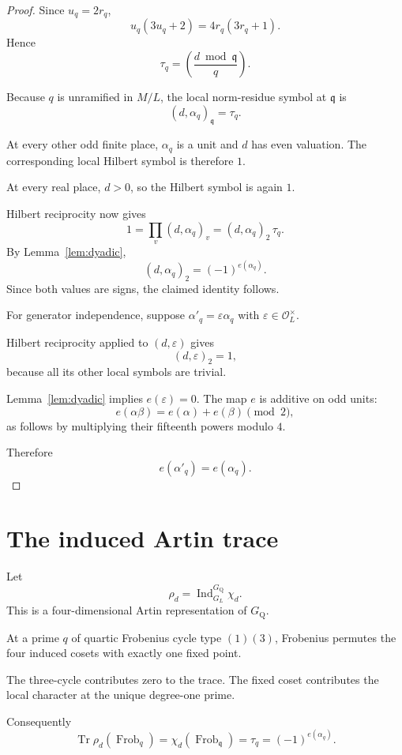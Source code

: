 \documentclass[11pt]{article}
\newcommand{\Q}{\mathrm Q}
\newcommand{\Ocal}{\mathcal O}
\newcommand{\Frob}{\operatorname{Frob}}
\begin{document}
\begin{proof}
Since $u_q=2r_q$,
\[
u_q(3u_q+2)
=4r_q(3r_q+1).
\]
Hence
\[
\tau_q=
\left(\frac{d\bmod\mathfrak q}{q}\right).
\]

Because $q$ is unramified in $M/L$,
the local norm-residue symbol at
$\mathfrak q$ is
\[
(d,\alpha_q)_{\mathfrak q}=\tau_q.
\]

At every other odd finite place,
$\alpha_q$ is a unit and $d$ has even
valuation. The corresponding local
Hilbert symbol is therefore $1$.

At every real place, $d>0$, so the
Hilbert symbol is again $1$.

Hilbert reciprocity now gives
\[
1=\prod_v(d,\alpha_q)_v
=(d,\alpha_q)_2\,\tau_q.
\]
By Lemma~\ref{lem:dyadic},
\[
(d,\alpha_q)_2=(-1)^{e(\alpha_q)}.
\]
Since both values are signs, the
claimed identity follows.

For generator independence, suppose
$\alpha'_q=\varepsilon\alpha_q$
with $\varepsilon\in\Ocal_L^\times$.

Hilbert reciprocity applied to
$(d,\varepsilon)$ gives
\[
(d,\varepsilon)_2=1,
\]
because all its other local symbols
are trivial.

Lemma~\ref{lem:dyadic} implies
$e(\varepsilon)=0$.
The map $e$ is additive on odd units:
\[
e(\alpha\beta)
=e(\alpha)+e(\beta)\pmod2,
\]
as follows by multiplying their
fifteenth powers modulo $4$.

Therefore
\[
e(\alpha'_q)=e(\alpha_q).
\]
\end{proof}

\section{The induced Artin trace}

Let
\[
\rho_d=
\operatorname{Ind}_{G_L}^{G_\Q}\chi_d.
\]
This is a four-dimensional Artin
representation of $G_\Q$.

At a prime $q$ of quartic Frobenius
cycle type $(1)(3)$, Frobenius permutes
the four induced cosets with exactly
one fixed point.

The three-cycle contributes zero to
the trace. The fixed coset contributes
the local character at the unique
degree-one prime.

Consequently
\begin{equation}\label{eq:artin-trace}
\boxed{
\operatorname{Tr}
\rho_d(\Frob_q)
=
\chi_d(\Frob_{\mathfrak q})
=\tau_q=(-1)^{e(\alpha_q)}.
}
\end{equation}
\end{document}

